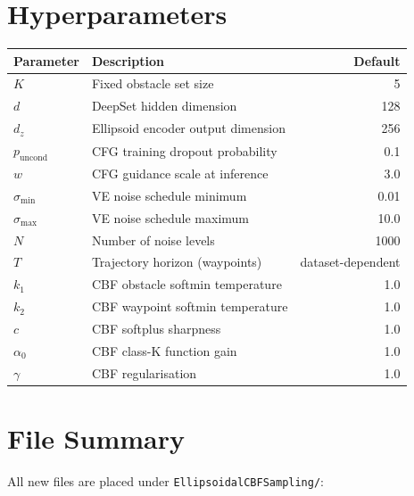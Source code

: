 \documentclass{article}
\begin{document}
\section{Hyperparameters}

\begin{center}
\begin{tabular}{llr}
\toprule
\textbf{Parameter} & \textbf{Description} & \textbf{Default} \\
\midrule
$K$ & Fixed obstacle set size & 5 \\
$d$ & DeepSet hidden dimension & 128 \\
$d_z$ & Ellipsoid encoder output dimension & 256 \\
$p_{\mathrm{uncond}}$ & CFG training dropout probability & 0.1 \\
$w$ & CFG guidance scale at inference & 3.0 \\
\midrule
$\sigma_{\min}$ & VE noise schedule minimum & 0.01 \\
$\sigma_{\max}$ & VE noise schedule maximum & 10.0 \\
$N$ & Number of noise levels & 1000 \\
$T$ & Trajectory horizon (waypoints) & dataset-dependent \\
\midrule
$k_1$ & CBF obstacle softmin temperature & 1.0 \\
$k_2$ & CBF waypoint softmin temperature & 1.0 \\
$c$ & CBF softplus sharpness & 1.0 \\
$\alpha_0$ & CBF class-K function gain & 1.0 \\
$\gamma$ & CBF regularisation & 1.0 \\
\bottomrule
\end{tabular}
\end{center}

\section{File Summary}

All new files are placed under \texttt{EllipsoidalCBFSampling/}:
\end{document}
